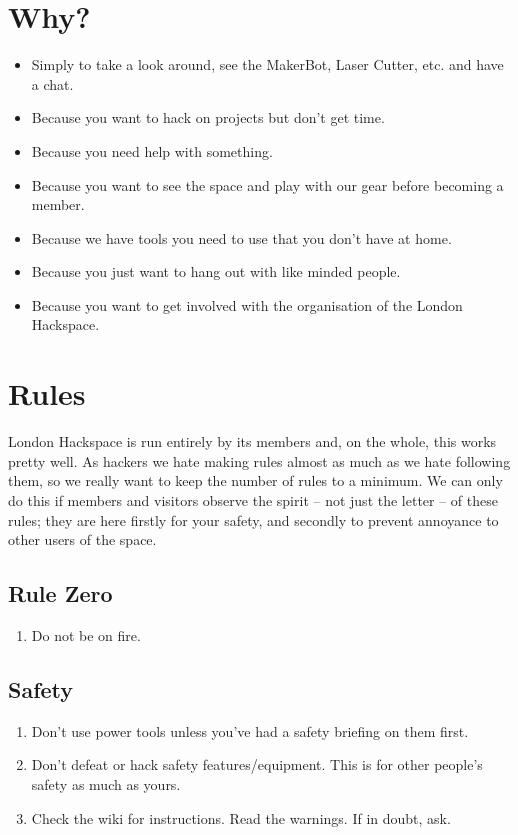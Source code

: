 \documentclass[12pt,a4paper]{book}
\begin{document}
\section{Why?}

\begin{itemize}
	\item Simply to take a look around, see the MakerBot, Laser Cutter, etc. and have a chat.
	\item Because you want to hack on projects but don't get time.
	\item Because you need help with something.
	\item Because you want to see the space and play with our gear before becoming a member.
	\item Because we have tools you need to use that you don't have at home.
	\item Because you just want to hang out with like minded people.
	\item Because you want to get involved with the organisation of the London Hackspace.
\end{itemize}

\section{Rules}

London Hackspace is run entirely by its members and, on the whole, this works pretty well. As hackers we hate making rules almost as much as we hate following them, so we really want to keep the number of rules to a minimum. We can only do this if members and visitors observe the spirit -- not just the letter -- of these rules; they are here firstly for your safety, and secondly to prevent annoyance to other users of the space.

\subsection{Rule Zero}

\begin{enumerate}[start=0]
	\item Do not be on fire.
\end{enumerate}

\subsection{Safety}

\begin{enumerate}[resume]
	\item Don't use power tools unless you've had a safety briefing on them first.
	\item Don't defeat or hack safety features/equipment. This is for other people's safety as much as yours.
	\item Check the wiki for instructions. Read the warnings. If in doubt, ask.
\end{enumerate}
\end{document}
